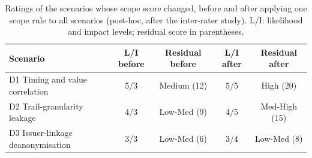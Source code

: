 \begin{table}[t]
\centering\small
\caption{Ratings of the scenarios whose scope score changed, before and after applying one scope rule to all scenarios (post-hoc, after the inter-rater study). L/I: likelihood and impact levels; residual score in parentheses.}
\label{tab:rerate}
\begin{tabular}{lcccc}
\toprule
Scenario & L/I before & Residual before & L/I after & Residual after \\
\midrule
D1 Timing and value correlation & 5/3 & Medium (12) & 5/5 & High (20) \\
D2 Trail-granularity leakage & 4/3 & Low-Med (9) & 4/5 & Med-High (15) \\
D3 Issuer-linkage deanonymisation & 3/3 & Low-Med (6) & 3/4 & Low-Med (8) \\
\bottomrule
\end{tabular}
\end{table}
